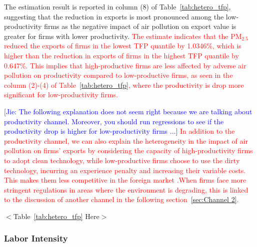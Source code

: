 \documentclass[12pt]{article}
\begin{document}
The estimation result is reported in column (8) of Table~\ref{tab:hetero_tfp}, suggesting that the reduction in exports is most pronounced among the low-productivity firms as the negative impact of air pollution on export value is greater for firms with lower productivity. \textcolor{red}{The estimate indicates that the $\mathrm{PM_{2.5}}$ reduced the exports of firms in the lowest TFP quantile by 1.0346\%, which is higher than the reduction in exports of firms in the highest TFP quantile by 0.647\%. This implies that high-productive firms are less affected by adverse air pollution on productivity compared to low-productive firms, as seen in the column (2)-(4) of Table~\ref{tab:hetero_tfp}, where the productivity is drop more significant for low-productivity firms.}

[\textcolor{blue}{Jie: The following explanation does not seem right because we are talking about productivity channel. Moreover, you should run regressions to see if the productivity drop is higher for low-productivity firms ...}] \textcolor{red}{In addition to the productivity channel, we can also explain the heterogeneity in the impact of air pollution on firms' exports by considering the capacity of high-productivity firms to adopt clean technology, while low-productive firms choose to use the dirty technology, incurring an experience penalty and increasing their variable costs. This makes them less competitive in the foreign market \citep{cherniwchan2022environmental}.When firms face more stringent regulations in areas where the environment is degrading, this is linked to the discussion of another channel in the following section~\ref{sec:Channel 2}.}

\begin{center}
$<$Table~\ref{tab:hetero_tfp} Here$>$
\end{center}

\subsubsection{Labor Intensity}
\end{document}
